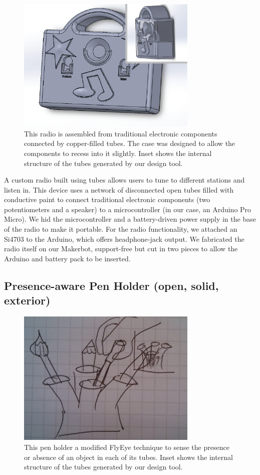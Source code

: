\begin{figure}[h]
\centering
    \includegraphics[width=3.4in]{figures/radio.png}
\caption{This radio is assembled from traditional electronic components connected by copper-filled tubes.  The case was designed to allow the components to recess into it slightly.  Inset shows the internal structure of the tubes generated by our design tool.}
\label{fig:radio}
\end{figure}

A custom radio built using tubes allows users to tune to different stations and listen in.  This device uses a network of disconnected open tubes filled with conductive paint to connect traditional electronic components (two potentiometers and a speaker) to a microcontroller (in our case, an Arduino Pro Micro).  We hid the microcontroller and a battery-driven power supply in the base of the radio to make it portable.  For the radio functionality, we attached an Si4703 to the Arduino, which offers headphone-jack output.  We fabricated the radio itself on our Makerbot, support-free but cut in two pieces to allow the Arduino and battery pack to be inserted.

\subsection{Presence-aware Pen Holder (open, solid, exterior)}

\begin{figure}[h]
\centering
    \includegraphics[width=3.4in]{figures/placeholder/pens.jpg}
\caption{This pen holder a modified FlyEye technique to sense the presence or absence of an object in each of its tubes.  Inset shows the internal structure of the tubes generated by our design tool.}
\label{fig:pens}
\end{figure}

